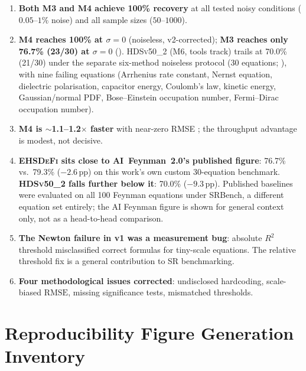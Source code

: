 \documentclass[twoside,11pt]{article}
\newcommand{\EHD}{\textsc{EHSDeFi}}
\newcommand{\HDS}{\textsc{HDSv50\_2}}
\newcommand{\Rsq}{R^{2}}
\newcommand{\rmse}{\ensuremath{\mathrm{RMSE}}}
\begin{document}
\begin{enumerate}
  \item \textbf{Both M3 and M4 achieve 100\% recovery} at all tested noisy
    conditions ($0.05$--$1\%$ noise) and all
    sample sizes ($50$--$1000$).
  \item \textbf{M4 reaches 100\% at $\sigma=0$} (noiseless, v2-corrected);
    \textbf{M3 reaches only 76.7\% (23/30) at $\sigma=0$}
    (). \HDS{} (M6, tools track) trails at 70.0\% (21/30)
    under the separate six-method noiseless protocol (30 equations;
    ), with nine failing equations (Arrhenius rate
    constant, Nernst equation, dielectric polarisation, capacitor energy,
    Coulomb's law, kinetic energy, Gaussian/normal PDF, Bose--Einstein
    occupation number, Fermi--Dirac occupation number).

  \item \textbf{M4 is $\sim$1.1--1.2$\times$ faster} with near-zero RMSE
    ; the throughput advantage is modest, not
    decisive.
  \item \textbf{\EHD{} sits close to AI~Feynman~2.0's published figure}:
    76.7\% vs.\ 79.3\% ($-2.6$\,pp) on this work's own custom 30-equation
    benchmark. \textbf{\HDS{} falls further below it}: 70.0\% ($-9.3$\,pp).
      Published baselines were evaluated on all 100
    Feynman equations under SRBench, a different equation set entirely;
    the AI Feynman figure is shown for general context only, not as a
    head-to-head comparison.
  \item \textbf{The Newton failure in v1 was a measurement bug}: absolute
    $\Rsq$ threshold misclassified correct formulas for tiny-scale equations.
    The relative threshold fix is a general contribution to SR benchmarking.
  \item \textbf{Four methodological issues corrected}: undisclosed hardcoding,
    scale-biased \rmse, missing significance tests, mismatched thresholds.
\end{enumerate}



\appendix

\section{Reproducibility Figure Generation Inventory}
\label{app:figures}
\end{document}
